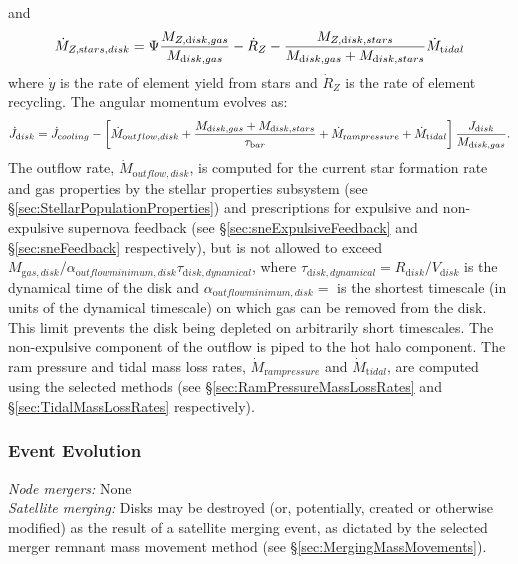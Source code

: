 and
\begin{equation}
 \dot{M}_{Z, {\mathrm stars, disk}} = \Psi {M_{Z, {\mathrm disk, gas}} \over M_{\mathrm disk, gas}} - \dot{R}_Z - {M_{Z, {\mathrm disk, stars}} \over M_{\mathrm disk, gas} + M_{\mathrm disk, stars}} \dot{M}_{\mathrm tidal}
\end{equation}
where $\dot{y}$ is the rate of element yield from stars and $\dot{R}_Z$ is the rate of element recycling. The angular momentum evolves as:
\begin{equation}
 \dot{J}_{\mathrm disk} = \dot{J}_{\mathrm cooling} - \left[ \dot{M}_{\mathrm outflow, disk} + {M_{\mathrm disk, gas}  + M_{\mathrm disk, stars} \over \tau_{\mathrm bar}} + \dot{M}_{\mathrm ram pressure} + \dot{M}_{\mathrm tidal}\right] {J_{\mathrm disk} \over M_{\mathrm disk, gas}}.
\end{equation}
The outflow rate, $\dot{M}_{\mathrm outflow, disk}$, is computed for the current star formation rate and gas properties by the stellar properties subsystem (see \S\ref{sec:StellarPopulationProperties}) and prescriptions for expulsive and non-expulsive supernova feedback (see \S\ref{sec:sneExpulsiveFeedback} and \S\ref{sec:sneFeedback} respectively), but is not allowed to exceed $M_{\mathrm gas, disk}/ \alpha_{\mathrm outflow minimum, disk} \tau_{\mathrm disk, dynamical}$, where $\tau_{\mathrm disk, dynamical}=R_{\mathrm disk}/V_{\mathrm disk}$ is the dynamical time of the disk and $\alpha_{\mathrm outflow minimum, disk}=${\normalfont \ttfamily [diskOutflowTimescaleMinimum]} is the shortest timescale (in units of the dynamical timescale) on which gas can be removed from the disk. This limit prevents the disk being depleted on arbitrarily short timescales. The non-expulsive \gls{component} of the outflow is piped to the hot halo component.  The ram pressure and tidal mass loss rates, $\dot{M}_{\mathrm ram pressure}$ and $\dot{M}_{\mathrm tidal}$, are computed using the selected methods (see \S\ref{sec:RamPressureMassLossRates} and \S\ref{sec:TidalMassLossRates} respectively).

\subsubsection{Event Evolution}

\noindent\emph{Node mergers:} None\\

\noindent\emph{Satellite merging:} Disks may be destroyed (or, potentially, created or otherwise modified) as the result of a satellite merging event, as dictated by the selected merger remnant mass movement method (see \S\ref{sec:MergingMassMovements}).\\

